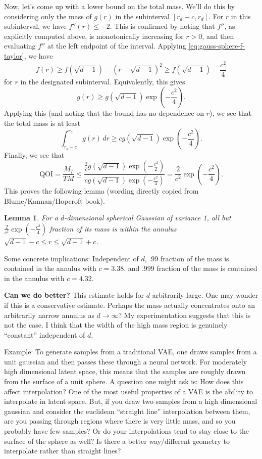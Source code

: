 \documentclass{book}
\newtheorem{lemma}{Lemma}
\newcommand{\dr}{\, dr}
\begin{document}
Now, let's come up with a lower bound on the total mass. We'll do this by considering only the mass of $g(r)$ in the subinterval $[r_d-c, r_d]$. For $r$ in this subinterval, we have $f''(r) \leq -2$. This is confirmed by noting that $f''$, as explicitly computed above, is monotonically increasing for $r>0$, and then evaluating $f''$ at the left endpoint of the interval. Applying \eqref{eq:gauss-sphere-f-taylor}, we have 
$$
f(r) \geq f(\sqrt{d-1}) - (r-\sqrt{d-1})^2 \geq f(\sqrt{d-1}) - \frac{c^2}{4}
$$
for $r$ in the designated subinterval. 
Equivalently, this gives
$$
g(r) \geq g(\sqrt{d-1})\exp(- \frac{c^2}{4}). 
$$
Applying this (and noting that the bound has no dependence on $r$), we see that the total mass is at least
$$
\int_{r_d - c}^{r_d} g(r)\dr  \geq cg(\sqrt{d-1})\exp(- \frac{c^2}{4}).
$$
Finally, we see that
 $$
\mbox{QOI} = \frac{M_{\bar I}}{TM} \leq \frac{\frac{2}{c}g(\sqrt{d-1})\exp(-\frac{c^2}{2})}{cg(\sqrt{d-1})\exp(- \frac{c^2}{4})} = \frac{2}{c^2}\exp(- \frac{c^2}{4}).
 $$
 This proves the following lemma (wording directly copied from Blume/Kannan/Hopcroft book). 
 \begin{lemma}
 For a $d$-dimensional spherical Gaussian of variance 1, all but $\frac{2}{c^2}\exp(- \frac{c^2}{4})$ fraction of its mass is within the annulus $\sqrt{d-1} - c \leq r \leq \sqrt{d-1} + c$. 
 \end{lemma}
 Some concrete implications: Independent of $d$, $.99$ fraction of the mass is contained in the annulus with $c = 3.38$. and $.999$ fraction of the mass is contained in the annulus with $c=4.32$. 
 
 \vspace{1em}
\noindent \textbf{Can we do better?} This estimate holds for $d$ arbitrarily large. One may wonder if this is a conservative estimate. Perhaps the mass actually concentrates onto an arbitrarily narrow annulus as $d\to \infty$? My experimentation suggests that this is not the case. I think that the width of the high mass region is genuinely ``constant'' independent of $d$. 
 
 Example: To generate samples from a traditional VAE, one draws samples from a unit gaussian and then passes these through a neural network. For moderately high dimensional latent space, this means that the samples are roughly drawn from the surface of a unit sphere. A question one might ask is: How does this affect interpolation? One of the most useful properties of a VAE is the ability to interpolate in latent space. But, if you draw two samples from a high dimensional gaussian and consider the euclidean ``straight line'' interpolation between them, are you passing through regions where there is very little mass, and so you probably have few samples? Or do your interpolations tend to stay close to the surface of the sphere as well? Is there a better way/different geometry to interpolate rather than straight lines?
 
\end{document}
